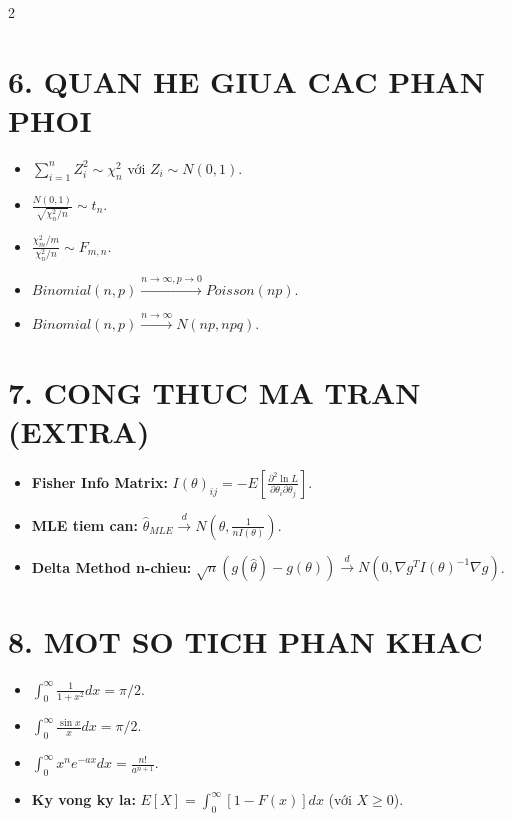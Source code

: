 \documentclass[8pt,a4paper]{article}
\begin{document}
\begin{multicols*}{2}
\section{6. QUAN HE GIUA CAC PHAN PHOI}
\begin{itemize}
    \item $\sum_{i=1}^n Z_i^2 \sim \chi^2_n$ với $Z_i \sim N(0,1)$.
    \item $\frac{N(0,1)}{\sqrt{\chi^2_n/n}} \sim t_n$.
    \item $\frac{\chi^2_m/m}{\chi^2_n/n} \sim F_{m,n}$.
    \item $Binomial(n, p) \xrightarrow{n \to \infty, p \to 0} Poisson(np)$.
    \item $Binomial(n, p) \xrightarrow{n \to \infty} N(np, npq)$.
\end{itemize}

\section{7. CONG THUC MA TRAN (EXTRA)}
\begin{itemize}
    \item \textbf{Fisher Info Matrix:} $I(\theta)_{ij} = -E[\frac{\partial^2 \ln L}{\partial \theta_i \partial \theta_j}]$.
    \item \textbf{MLE tiem can:} $\hat{\theta}_{MLE} \xrightarrow{d} N(\theta, \frac{1}{n I(\theta)})$.
    \item \textbf{Delta Method n-chieu:} $\sqrt{n}(g(\hat{\theta}) - g(\theta)) \xrightarrow{d} N(0, \nabla g^T I(\theta)^{-1} \nabla g)$.
\end{itemize}

\section{8. MOT SO TICH PHAN KHAC}
\begin{itemize}
    \item $\int_0^\infty \frac{1}{1+x^2} dx = \pi/2$.
    \item $\int_0^\infty \frac{\sin x}{x} dx = \pi/2$.
    \item $\int_0^\infty x^n e^{-ax} dx = \frac{n!}{a^{n+1}}$.
    \item \textbf{Ky vong ky la:} $E[X] = \int_0^\infty [1-F(x)]dx$ (với $X \geq 0$).
\end{itemize}

\end{multicols*}
\end{document}
